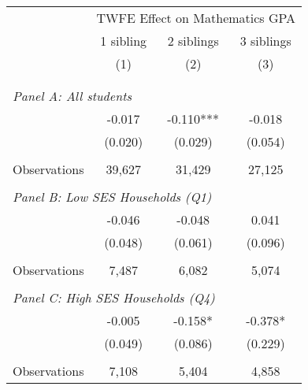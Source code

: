 \makeatletter
{}
{
\makeatother
\begin{tabular}{lccc}
\toprule
\cmidrule(lr){2-4}
& \multicolumn{3}{c}{TWFE Effect on Mathematics GPA} \\
\cmidrule(lr){2-4}
& 1 sibling & 2 siblings & 3 siblings  \\
\cmidrule(lr){2-2} \cmidrule(lr){3-3} \cmidrule(lr){4-4}
& (1) & (2) & (3)\\
\bottomrule
&  &  &  \\
&  &  &   \\
\multicolumn{4}{l}{\textit{Panel A: All students}} \\
\hspace{3mm}        &      -0.017   &      -0.110***&      -0.018   \\
                    &     (0.020)   &     (0.029)   &     (0.054)   \\
                    &               &               &               \\
\hspace{3mm}Observations&      39,627   &      31,429   &      27,125   \\
 
&  &  &   \\
\multicolumn{4}{l}{\textit{Panel B: Low SES Households (Q1)}} \\
\hspace{3mm}        &      -0.046   &      -0.048   &       0.041   \\
                    &     (0.048)   &     (0.061)   &     (0.096)   \\
                    &               &               &               \\
\hspace{3mm}Observations&       7,487   &       6,082   &       5,074   \\
 
&  &  &   \\
\multicolumn{4}{l}{\textit{Panel C: High SES Households (Q4)}} \\
\hspace{3mm}        &      -0.005   &      -0.158*  &      -0.378*  \\
                    &     (0.049)   &     (0.086)   &     (0.229)   \\
                    &               &               &               \\
\hspace{3mm}Observations&       7,108   &       5,404   &       4,858   \\
 

\end{tabular}}
